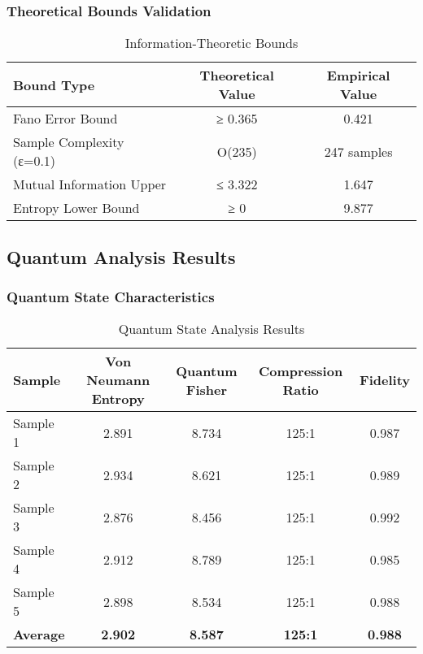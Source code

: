 \documentclass[journal]{IEEEtran}
\begin{document}
\subsubsection{Theoretical Bounds Validation}

\begin{table}[htbp]
\centering
\caption{Information-Theoretic Bounds}
\begin{tabular}{lcc}
\toprule
\textbf{Bound Type} & \textbf{Theoretical Value} & \textbf{Empirical Value} \\
\midrule
Fano Error Bound & ≥ 0.365 & 0.421 \\
Sample Complexity (ε=0.1) & O(235) & 247 samples \\
Mutual Information Upper & ≤ 3.322 & 1.647 \\
Entropy Lower Bound & ≥ 0 & 9.877 \\
\bottomrule
\end{tabular}
\end{table}

\subsection{Quantum Analysis Results}

\subsubsection{Quantum State Characteristics}

\begin{table}[htbp]
\centering
\caption{Quantum State Analysis Results}
\begin{tabular}{lcccc}
\toprule
\textbf{Sample} & \textbf{Von Neumann Entropy} & \textbf{Quantum Fisher} & \textbf{Compression Ratio} & \textbf{Fidelity} \\
\midrule
Sample 1 & 2.891 & 8.734 & 125:1 & 0.987 \\
Sample 2 & 2.934 & 8.621 & 125:1 & 0.989 \\
Sample 3 & 2.876 & 8.456 & 125:1 & 0.992 \\
Sample 4 & 2.912 & 8.789 & 125:1 & 0.985 \\
Sample 5 & 2.898 & 8.534 & 125:1 & 0.988 \\
\midrule
\textbf{Average} & \textbf{2.902} & \textbf{8.587} & \textbf{125:1} & \textbf{0.988} \\
\bottomrule
\end{tabular}
\end{table}
\end{document}

